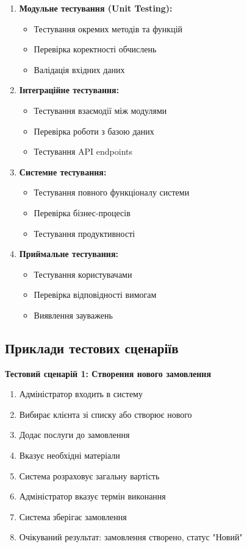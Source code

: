 \documentclass[14pt,a4paper]{extarticle}
\begin{document}
\begin{enumerate}
    \item \textbf{Модульне тестування (Unit Testing):}
    \begin{itemize}
        \item Тестування окремих методів та функцій
        \item Перевірка коректності обчислень
        \item Валідація вхідних даних
    \end{itemize}
    
    \item \textbf{Інтеграційне тестування:}
    \begin{itemize}
        \item Тестування взаємодії між модулями
        \item Перевірка роботи з базою даних
        \item Тестування API endpoints
    \end{itemize}
    
    \item \textbf{Системне тестування:}
    \begin{itemize}
        \item Тестування повного функціоналу системи
        \item Перевірка бізнес-процесів
        \item Тестування продуктивності
    \end{itemize}
    
    \item \textbf{Приймальне тестування:}
    \begin{itemize}
        \item Тестування користувачами
        \item Перевірка відповідності вимогам
        \item Виявлення зауважень
    \end{itemize}
\end{enumerate}

\subsection{Приклади тестових сценаріїв}

\textbf{Тестовий сценарій 1: Створення нового замовлення}

\begin{enumerate}
    \item Адміністратор входить в систему
    \item Вибирає клієнта зі списку або створює нового
    \item Додає послуги до замовлення
    \item Вказує необхідні матеріали
    \item Система розраховує загальну вартість
    \item Адміністратор вказує термін виконання
    \item Система зберігає замовлення
    \item Очікуваний результат: замовлення створено, статус "Новий"
\end{enumerate}
\end{document}
